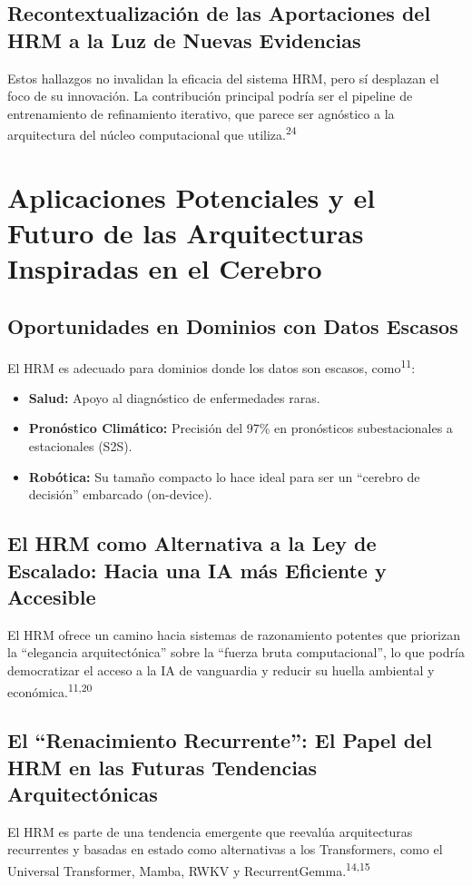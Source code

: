 \documentclass{article}
\begin{document}
	\subsection{Recontextualización de las Aportaciones del HRM a la Luz de Nuevas Evidencias}
	Estos hallazgos no invalidan la eficacia del sistema HRM, pero sí desplazan el foco de su innovación. La contribución principal podría ser el pipeline de entrenamiento de refinamiento iterativo, que parece ser agnóstico a la arquitectura del núcleo computacional que utiliza.\textsuperscript{24}
	
	\section{Aplicaciones Potenciales y el Futuro de las Arquitecturas Inspiradas en el Cerebro}
	
	\subsection{Oportunidades en Dominios con Datos Escasos}
	El HRM es adecuado para dominios donde los datos son escasos, como\textsuperscript{11}:
	\begin{itemize}
		\item \textbf{Salud:} Apoyo al diagnóstico de enfermedades raras.
		\item \textbf{Pronóstico Climático:} Precisión del 97\% en pronósticos subestacionales a estacionales (S2S).
		\item \textbf{Robótica:} Su tamaño compacto lo hace ideal para ser un ``cerebro de decisión'' embarcado (on-device).
	\end{itemize}
	
	\subsection{El HRM como Alternativa a la Ley de Escalado: Hacia una IA más Eficiente y Accesible}
	El HRM ofrece un camino hacia sistemas de razonamiento potentes que priorizan la ``elegancia arquitectónica'' sobre la ``fuerza bruta computacional'', lo que podría democratizar el acceso a la IA de vanguardia y reducir su huella ambiental y económica.\textsuperscript{11,20}
	
	\subsection{El ``Renacimiento Recurrente'': El Papel del HRM en las Futuras Tendencias Arquitectónicas}
	El HRM es parte de una tendencia emergente que reevalúa arquitecturas recurrentes y basadas en estado como alternativas a los Transformers, como el Universal Transformer, Mamba, RWKV y RecurrentGemma.\textsuperscript{14,15}
	
\end{document}
